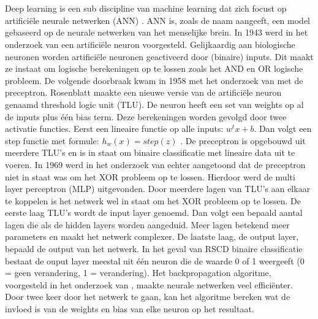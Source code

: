 \section{}%
\label{sec:deep-learning-neurale-netwerken}

Deep learning is een sub discipline van machine learning dat zich focust op artificiële neurale netwerken (ANN) \autocite{Geron2022}. 
ANN is, zoals de naam aangeeft, een model gebaseerd op de neurale netwerken van het menselijke brein. In 1943 werd in het onderzoek van 
\textcite{McCulloch1943} een artificiële neuron voorgesteld. Gelijkaardig aan biologische neuronen worden artificiële neuronen 
geactiveerd door (binaire) inputs. Dit maakt ze instaat om logische berekeningen op te lossen zoals het AND en OR logische probleem. 
\newline
\newline
De volgende doorbraak kwam in 1958 met het onderzoek van \textcite{Rosenblatt1958} met de preceptron. 
Rosenblatt maakte een nieuwe versie van de artificiële neuron genaamd threshold logic unit (TLU). 
De neuron heeft een set van weights op al de inputs plus één bias term.
Deze berekeningen worden gevolgd door twee activatie functies. Eerst een lineaire functie op alle inputs: \( w^t x + b \).
Dan volgt een step functie met formule: \(h_w(x) = step(z)\) \autocite{Geron2022}. De preceptron is opgebouwd uit meerdere TLU's en is in staat om binaire 
classificatie met lineaire data uit te voeren. In 1969 werd in het onderzoek van \textcite{Minsky1969} echter aangetoond dat de 
preceptron niet in staat was om het XOR probleem op te lossen. Hierdoor werd de multi layer perceptron (MLP) uitgevonden. Door meerdere 
lagen van TLU's aan elkaar te koppelen is het netwerk wel in staat om het XOR probleem op te lossen. De eerste laag TLU's wordt de input layer genoemd.
Dan volgt een bepaald aantal lagen die als de hidden layers worden aangeduid. Meer lagen betekend meer parameters en maakt het netwerk complexer.
De laatste laag, de output layer, bepaald de output van het netwerk. In het geval van RSCD binaire classificatie bestaat de ouput layer meestal 
uit één neuron die de waarde 0 of 1 weergeeft (0 = geen verandering, 1 = verandering).
\newline
\newline
Het backpropagation algoritme, voorgesteld in het onderzoek van \textcite{Rumelhart1986}, maakte neurale netwerken veel efficiënter.
Door twee keer door het netwerk te gaan, kan het algoritme bereken wat de invloed is van de weights en bias van elke neuron op het resultaat.
